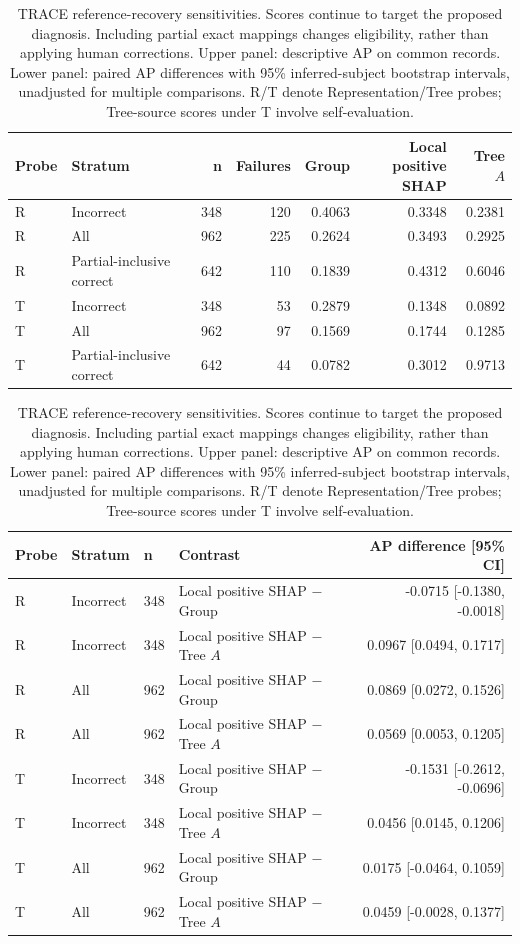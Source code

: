 \begin{table}[!tbp]\centering\scriptsize
\caption{TRACE reference-recovery sensitivities. Scores continue to target the proposed diagnosis. Including partial exact mappings changes eligibility, rather than applying human corrections. Upper panel: descriptive AP on common records. Lower panel: paired AP differences with 95\% inferred-subject bootstrap intervals, unadjusted for multiple comparisons. R/T denote Representation/Tree probes; Tree-source scores under T involve self-evaluation.}\label{tab:trace-natural-sensitivity}
\begin{tabular}{llrrrrr}\toprule
Probe & Stratum & n & Failures & Group & \shortstack{Local positive\\SHAP} & Tree $A$ \\ \midrule
R & Incorrect & 348 & 120 & 0.4063 & 0.3348 & 0.2381 \\
R & All & 962 & 225 & 0.2624 & 0.3493 & 0.2925 \\
R & Partial-inclusive correct & 642 & 110 & 0.1839 & 0.4312 & 0.6046 \\
T & Incorrect & 348 & 53 & 0.2879 & 0.1348 & 0.0892 \\
T & All & 962 & 97 & 0.1569 & 0.1744 & 0.1285 \\
T & Partial-inclusive correct & 642 & 44 & 0.0782 & 0.3012 & 0.9713 \\
\bottomrule\end{tabular}

\par\smallskip
\begin{tabular}{lll lr}\toprule
Probe & Stratum & n & Contrast & AP difference [95\% CI] \\ \midrule
R & Incorrect & 348 & Local positive SHAP $-$ Group & -0.0715 [-0.1380, -0.0018] \\
R & Incorrect & 348 & Local positive SHAP $-$ Tree $A$ & 0.0967 [0.0494, 0.1717] \\
R & All & 962 & Local positive SHAP $-$ Group & 0.0869 [0.0272, 0.1526] \\
R & All & 962 & Local positive SHAP $-$ Tree $A$ & 0.0569 [0.0053, 0.1205] \\
T & Incorrect & 348 & Local positive SHAP $-$ Group & -0.1531 [-0.2612, -0.0696] \\
T & Incorrect & 348 & Local positive SHAP $-$ Tree $A$ & 0.0456 [0.0145, 0.1206] \\
T & All & 962 & Local positive SHAP $-$ Group & 0.0175 [-0.0464, 0.1059] \\
T & All & 962 & Local positive SHAP $-$ Tree $A$ & 0.0459 [-0.0028, 0.1377] \\
\bottomrule\end{tabular}
\end{table}

